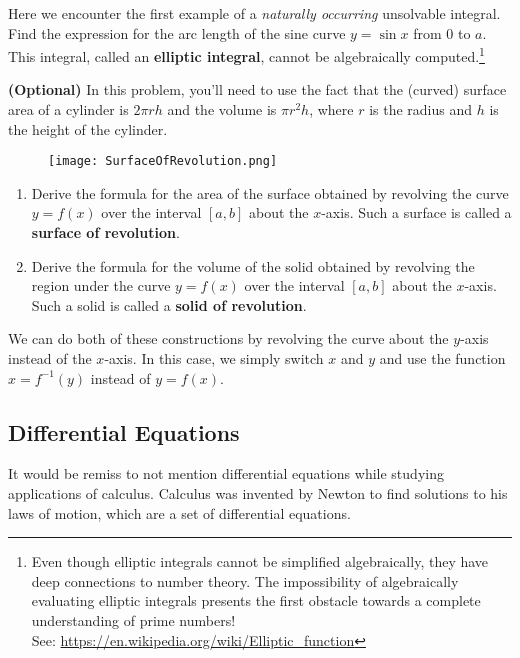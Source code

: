 \begin{exercise}
  Here we encounter the first example of a {\it naturally occurring} unsolvable integral.
  Find the expression for the arc length of the sine curve $y = \sin x$ from 0 to $a$.
  This integral, called an {\bf elliptic integral}, cannot be algebraically computed.\footnote{Even though elliptic integrals cannot be simplified algebraically, they have deep connections to number theory.
  The impossibility of algebraically evaluating elliptic integrals presents the first obstacle towards a complete understanding of prime numbers!\\
  See: \url{https://en.wikipedia.org/wiki/Elliptic_function}}
\end{exercise}

\begin{exercise}{\bf (Optional)}
  In this problem, you'll need to use the fact that the (curved) surface area of a cylinder is $2 \pi r h$ and the volume is $\pi r^2 h$, where $r$ is the radius and $h$ is the height of the cylinder.
  \begin{figure}[H]
    \centering
    \texttt{[image: SurfaceOfRevolution.png]}
  \end{figure}
  \end{exercise}
  \begin{enumerate}
    \item Derive the formula for the area of the surface obtained by revolving the curve $y = f(x)$ over the interval $[a,b]$ about the $x$-axis.
   Such a surface is called a {\bf surface of revolution}.
    \item Derive the formula for the volume of the solid obtained by revolving the region under the curve $y = f(x)$ over the interval $[a,b]$ about the $x$-axis.
    Such a solid is called a {\bf solid of revolution}.
  \end{enumerate}
We can do both of these constructions by revolving the curve about the $y$-axis instead of the $x$-axis. In this case, we simply switch $x$ and $y$ and use the function $x=f^{-1}(y)$ instead of $y = f(x)$.\\


\subsection{Differential Equations}
It would be remiss to not mention differential equations while studying applications of calculus.
Calculus was invented by Newton to find solutions to his laws of motion, which are a set of differential equations.

